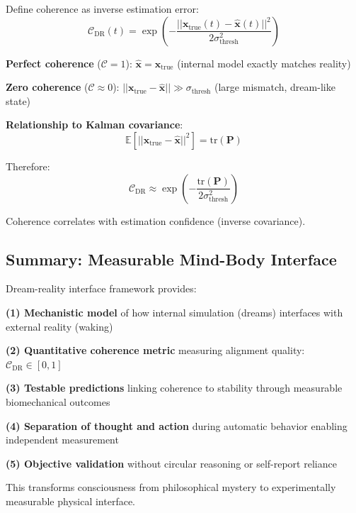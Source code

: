 \documentclass[11pt,onecolumn]{article}
\begin{document}
Define coherence as inverse estimation error:
\begin{equation}
\mathcal{C}_{\text{DR}}(t) = \exp\left(-\frac{||\mathbf{x}_{\text{true}}(t) - \hat{\mathbf{x}}(t)||^2}{2\sigma_{\text{thresh}}^2}\right)
\end{equation}

\textbf{Perfect coherence} ($\mathcal{C} = 1$): $\hat{\mathbf{x}} = \mathbf{x}_{\text{true}}$ (internal model exactly matches reality)

\textbf{Zero coherence} ($\mathcal{C} \approx 0$): $||\mathbf{x}_{\text{true}} - \hat{\mathbf{x}}|| \gg \sigma_{\text{thresh}}$ (large mismatch, dream-like state)

\textbf{Relationship to Kalman covariance}:
\begin{equation}
\mathbb{E}[||\mathbf{x}_{\text{true}} - \hat{\mathbf{x}}||^2] = \text{tr}(\mathbf{P})
\end{equation}

Therefore:
\begin{equation}
\mathcal{C}_{\text{DR}} \approx \exp\left(-\frac{\text{tr}(\mathbf{P})}{2\sigma_{\text{thresh}}^2}\right)
\end{equation}

Coherence correlates with estimation confidence (inverse covariance).

\clearpage

\subsection{Summary: Measurable Mind-Body Interface}

Dream-reality interface framework provides:

\textbf{(1) Mechanistic model} of how internal simulation (dreams) interfaces with external reality (waking)

\textbf{(2) Quantitative coherence metric} measuring alignment quality: $\mathcal{C}_{\text{DR}} \in [0,1]$

\textbf{(3) Testable predictions} linking coherence to stability through measurable biomechanical outcomes

\textbf{(4) Separation of thought and action} during automatic behavior enabling independent measurement

\textbf{(5) Objective validation} without circular reasoning or self-report reliance

This transforms consciousness from philosophical mystery to experimentally measurable physical interface.
\end{document}
